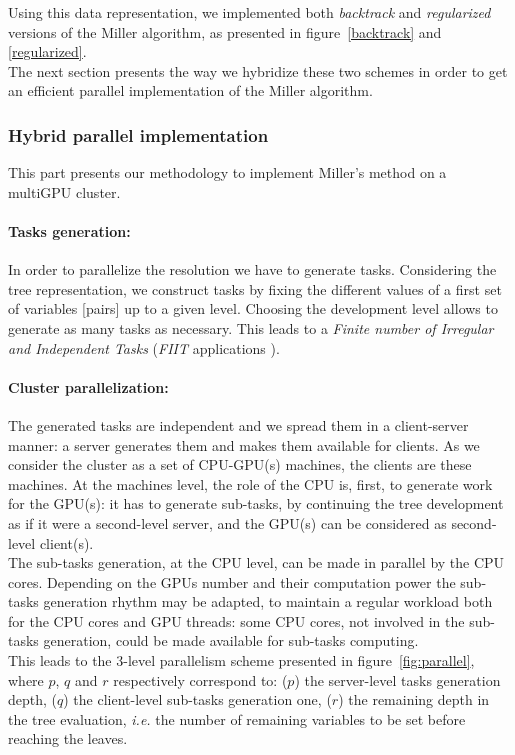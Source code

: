 Using this data representation, 
we implemented both \emph{backtrack} and \emph{regularized} versions of the Miller algorithm, as presented in figure~\ref{backtrack} and \ref{regularized}.
\\
The next section presents the way we hybridize these two schemes in order to get an efficient parallel implementation of the Miller algorithm.

\subsubsection{Hybrid parallel implementation}
\label{section:parallel_backtrack}
This part presents our methodology to implement Miller's method on a multiGPU cluster.

\paragraph{Tasks generation: }
In order to parallelize the resolution we have to generate tasks. 
Considering the tree representation, we construct tasks by fixing the different values of a first set of variables [pairs] up to a given level. Choosing the development level allows to generate as many tasks as necessary. This leads to a \textit{Finite number of Irregular and Independent Tasks} (\emph{FIIT} applications \cite{krajecki1999object}). 

\paragraph{Cluster parallelization: } 
The generated tasks are independent and we spread them in a client-server manner: a server generates them and makes them available for clients. As we consider the cluster as a set of CPU-GPU(s) machines, the clients are these machines. 
At the machines level, the role of the CPU is, first, to generate work for the GPU(s): it has to generate sub-tasks, by continuing the tree development as if it were a second-level server, and the GPU(s) can be considered as second-level client(s). \\
The sub-tasks generation, at the CPU level, can be made in parallel by the CPU cores. Depending on the GPUs number and their computation power the sub-tasks generation rhythm may be adapted, to maintain a regular workload both for the CPU cores and GPU threads: some CPU cores, not involved in the sub-tasks generation, could be made available for sub-tasks computing.\\
This leads to the 3-level parallelism scheme presented in figure~\ref{fig:parallel}, where $p$, $q$ and $r$ respectively correspond to: ($p$) the server-level tasks generation depth, ($q$) the client-level sub-tasks generation one, ($r$) the remaining depth in the tree evaluation, \textit{i.e.} the number of remaining variables to be set before reaching the leaves.  

